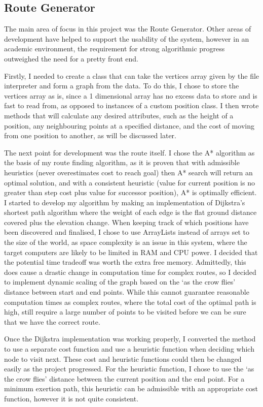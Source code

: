 \documentclass[12pt,a4paper]{article}
\begin{document}
  \subsection{Route Generator}
  \noindent The main area of focus in this project was the Route Generator. Other areas of development have helped to support the usability of the system, however in an academic environment, the requirement for strong algorithmic progress outweighed the need for a pretty front end.
  \par Firstly, I needed to create a class that can take the vertices array given by the file interpreter and form a graph from the data. To do this, I chose to store the vertices array as is, since a 1 dimensional array has no excess data to store and is fast to read from, as opposed to instances of a custom position class. I then wrote methods that will calculate any desired attributes, such as the height of a position, any neighbouring points at a specified distance, and the cost of moving from one position to another, as will be discussed later.
  \par The next point for development was the route itself. I chose the A* algorithm as the basis of my route finding algorithm, as it is proven that with admissible heuristics (never overestimates cost to reach goal) then A* search will return an optimal solution, and with a consistent heuristic (value for current position is no greater than step cost plus value for successor position), A* is optimally efficient.\cite{stewart_ai_search} I started to develop my algorithm by making an implementation of Dijkstra's shortest path algorithm where the weight of each edge is the flat ground distance covered plus the elevation change. When keeping track of which positions have been discovered and finalised, I chose to use ArrayLists instead of arrays set to the size of the world, as space complexity is an issue in this system, where the target computers are likely to be limited in RAM and CPU power. I decided that the potential time tradeoff was worth the extra free memory. Admittedly, this does cause a drastic change in computation time for complex routes, so I decided to implement dynamic scaling of the graph based on the `as the crow flies' distance between start and end points. While this cannot guarantee reasonable computation times as complex routes, where the total cost of the optimal path is high, still require a large number of points to be visited before we can be sure that we have the correct route.
  \par Once the Dijkstra implementation was working properly, I converted the method to use a separate cost function and use a heuristic function when deciding which node to visit next. These cost and heuristic functions could then be changed easily as the project progressed. For the heuristic function, I chose to use the `as the crow flies' distance between the current position and the end point. For a minimum exertion path, this heuristic can be admissible with an appropriate cost function, however it is not quite consistent.
\end{document}
